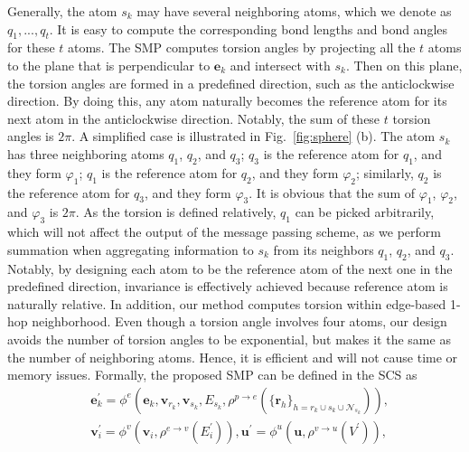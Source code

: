 \documentclass{article}
\begin{document}
Generally, the atom $s_k$ may have several neighboring atoms,
which we denote as $q_1, ..., q_t$.
It is easy to compute the corresponding bond lengths and bond angles for these $t$ atoms.
The SMP computes torsion angles by projecting
all the $t$ atoms to the plane that is perpendicular to $\mathbf{e}_k$
and intersect with $s_k$.
Then on this plane, the torsion angles are formed in a predefined direction, such as the anticlockwise direction.
By doing this, any atom naturally becomes the reference atom for its next atom
in the anticlockwise direction.
Notably, the sum of these $t$ torsion angles is $2\pi$.
A simplified case is illustrated in Fig.~\ref{fig:sphere} (b).
The atom $s_k$ has three neighboring atoms $q_1$, $q_2$, and $q_3$;
$q_3$ is the reference atom for $q_1$, and they form $\varphi_1$;
$q_1$ is the reference atom for $q_2$, and they form $\varphi_2$;
similarly, $q_2$ is the reference atom for $q_3$, and they form $\varphi_3$.
It is obvious that the sum of $\varphi_1$, $\varphi_2$, and $\varphi_3$ is $2\pi$.
\textcolor{COLOR}{As the torsion is defined relatively, $q_1$ can be picked arbitrarily, which will not
affect the output of the message passing scheme, as we perform summation when aggregating information to $s_k$ from its neighbors
$q_1$, $q_2$, and $q_3$.}
Notably, by designing each atom to be the reference atom of the next one in the predefined direction,
invariance is effectively achieved because reference atom is naturally relative.
In addition, our method computes torsion within edge-based 1-hop neighborhood. 
Even though a torsion angle involves four atoms, 
our design avoids the number
of torsion angles to be exponential,
but makes it the same as the number of neighboring atoms.
Hence, it is efficient and will not cause time or memory issues.
Formally, the proposed SMP can be defined in the SCS as
\begin{equation}\label{eq:sp_fw}
\begin{aligned}
&\mathbf{e}^\prime_k = \phi^e\left(\mathbf{e}_k, \mathbf{v}_{r_k}, \mathbf{v}_{s_k}, E_{s_k}, \rho^{p\rightarrow e}\left(\{\mathbf{r}_h\}_{h=r_k \cup s_k \cup \mathcal{N}_{s_k}}\right)\right), \\
&\mathbf{v}^\prime_i = \phi^v\left(\mathbf{v}_i, \rho^{e\rightarrow v}\left(E_i^{\prime}\right)\right),
\mathbf{u}^\prime =  \phi^u\left(\mathbf{u}, \rho^{v\rightarrow u}\left(V^\prime\right)\right),
\end{aligned}
\end{equation}
\end{document}
